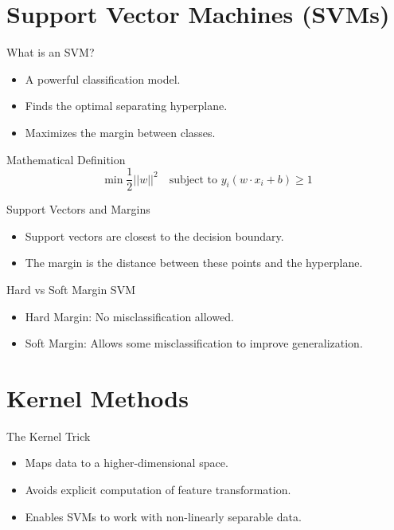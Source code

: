 \documentclass[11pt]{beamer}
\begin{document}
\section{Support Vector Machines (SVMs)}
\begin{frame}{What is an SVM?}
    \begin{itemize}
        \item A powerful classification model.
        \item Finds the optimal separating hyperplane.
        \item Maximizes the margin between classes.
    \end{itemize}
\end{frame}

\begin{frame}{Mathematical Definition}
    $$ \min \frac{1}{2} ||w||^2 \quad \text{subject to } y_i (w \cdot x_i + b) \geq 1 $$
\end{frame}

\begin{frame}{Support Vectors and Margins}
    \begin{itemize}
        \item Support vectors are closest to the decision boundary.
        \item The margin is the distance between these points and the hyperplane.
    \end{itemize}
\end{frame}

\begin{frame}{Hard vs Soft Margin SVM}
    \begin{itemize}
        \item Hard Margin: No misclassification allowed.
        \item Soft Margin: Allows some misclassification to improve generalization.
    \end{itemize}
\end{frame}

\section{Kernel Methods}
\begin{frame}{The Kernel Trick}
    \begin{itemize}
        \item Maps data to a higher-dimensional space.
        \item Avoids explicit computation of feature transformation.
        \item Enables SVMs to work with non-linearly separable data.
    \end{itemize}
\end{frame}
\end{document}
